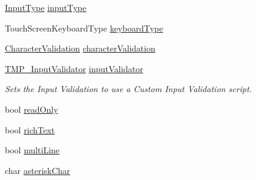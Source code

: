 \begin{DoxyCompactItemize}
\item 
\mbox{\hyperlink{class_t_m_pro_1_1_t_m_p___input_field_ab72a4b889f55cc4a2f98611fca609ccf}{Input\+Type}} \mbox{\hyperlink{class_t_m_pro_1_1_t_m_p___input_field_a5c3a71f562853f264523c61e0f719683}{input\+Type}}
\item 
Touch\+Screen\+Keyboard\+Type \mbox{\hyperlink{class_t_m_pro_1_1_t_m_p___input_field_ae050f33bb2ccfacb6983c97a0cef4505}{keyboard\+Type}}
\item 
\mbox{\hyperlink{class_t_m_pro_1_1_t_m_p___input_field_a96ac8b8cc04492aadbf24839b8d6376e}{Character\+Validation}} \mbox{\hyperlink{class_t_m_pro_1_1_t_m_p___input_field_a56b1eac3a3a883380b261358b4ccf63f}{character\+Validation}}
\item 
\mbox{\hyperlink{class_t_m_pro_1_1_t_m_p___input_validator}{T\+M\+P\+\_\+\+Input\+Validator}} \mbox{\hyperlink{class_t_m_pro_1_1_t_m_p___input_field_a0133238d9e97ac0eafb921dede2f9ff7}{input\+Validator}}
\begin{DoxyCompactList}\small\item\em Sets the Input Validation to use a Custom Input Validation script. \end{DoxyCompactList}\item 
bool \mbox{\hyperlink{class_t_m_pro_1_1_t_m_p___input_field_a2148fac74d4c78ea333f8d4b589c4883}{read\+Only}}
\item 
bool \mbox{\hyperlink{class_t_m_pro_1_1_t_m_p___input_field_a5e4d09d36172c6647cf70dc6223c6bfa}{rich\+Text}}
\item 
bool \mbox{\hyperlink{class_t_m_pro_1_1_t_m_p___input_field_a76c102dad3fdfa675bd65d5c382a1c8d}{multi\+Line}}
\item 
char \mbox{\hyperlink{class_t_m_pro_1_1_t_m_p___input_field_ac79a41642fb8efadc77aeaf6af2695dc}{asterisk\+Char}}
\item 

\end{DoxyCompactItemize}
